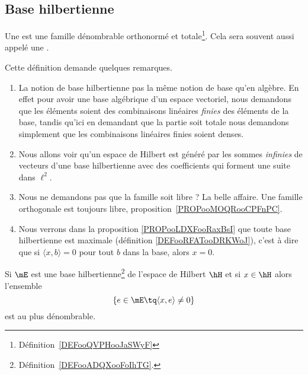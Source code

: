 \subsection{Base hilbertienne}

\begin{definition}      \label{DEFooADQXooFoIhTG}
	Une  est une famille dénombrable orthonormé et totale\footnote{Définition~\ref{DEFooQVPHooJaSWyF}}. Cela sera souvent aussi appelé une .
\end{definition}

\begin{normaltext}
	Cette définition demande quelques remarques.

	\begin{enumerate}
		\item
		      La notion de base hilbertienne pas la même notion de base qu'en algèbre. En effet pour avoir une base algébrique d'un espace vectoriel, nous demandons que les éléments soient des combinaisons linéaires \emph{finies} des éléments de la base, tandis qu'ici en demandant que la partie soit totale nous demandons simplement que les combinaisons linéaires finies soient denses.
		\item
		      Nous allons voir qu'un espace de Hilbert est généré par les sommes \emph{infinies} de vecteurs d'une base hilbertienne avec des coefficients qui forment une suite dans \( \ell^2\).
		\item
		      Nous ne demandons pas que la famille soit libre ? La belle affaire. Une famille orthogonale est toujours libre, proposition~\ref{PROPooMOQRooCPFnPC}.
		\item
		      Nous verrons dans la proposition \ref{PROPooLDXFooRaxBsI} que toute base hilbertienne est maximale (définition \ref{DEFooRFATooDRKWoJ}), c'est à dire que si \( \langle x, b\rangle =0\) pour tout \( b\) dans la base, alors \( x=0\).
	\end{enumerate}
\end{normaltext}

\begin{lemma}       \label{LEMooHWOBooQJKdTD}
	Si \( \mE\) est une base hilbertienne\footnote{Définition~\ref{DEFooADQXooFoIhTG}.} de l'espace de Hilbert \( \hH\) et si \( x\in \hH\) alors l'ensemble
	\begin{equation}
		\{ e\in\mE\tq \langle x, e\rangle \neq 0 \}
	\end{equation}
	est au plus dénombrable.
\end{lemma}

